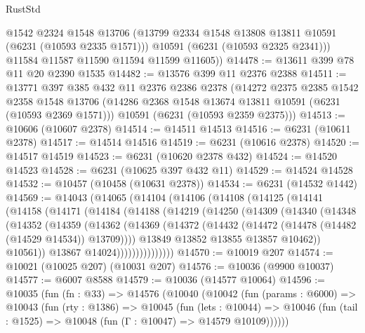 \begin{lexlean}{RustStd}
\begin{coremodule}
{{          @1542
          @2324
          @1548
          @13706
          (@13799 @2334 @1548 @13808 @13811 @10591 (@6231 (@10593 @2335 @1571)))
          @10591
          (@6231 (@10593 @2325 @2341)))
        @11584
        @11587
        @11590
        @11594
        @11599
        @11605))
@14478 := @13611 @399 @78 @11 @20 @2390 @1535
@14482 := @13576 @399 @11 @2376 @2388
@14511 := @13771
    @397
    @385
    @432
    @11
    @2376
    @2386
    @2378
    (@14272
      @2375
      @2385
      @1542
      @2358
      @1548
      @13706
      (@14286 @2368 @1548 @13674 @13811 @10591 (@6231 (@10593 @2369 @1571)))
      @10591
      (@6231 (@10593 @2359 @2375)))
@14513 := @10606 (@10607 @2378)
@14514 := @14511 @14513
@14516 := @6231 (@10611 @2378)
@14517 := @14514 @14516
@14519 := @6231 (@10616 @2378)
@14520 := @14517 @14519
@14523 := @6231 (@10620 @2378 @432)
@14524 := @14520 @14523
@14528 := @6231 (@10625 @397 @432 @11)
@14529 := @14524 @14528
@14532 := @10457 (@10458 (@10631 @2378))
@14534 := @6231 (@14532 @1442)
@14569 := @14043
    (@14065
      (@14104
        (@14106
          (@14108
            (@14125
              (@14141
                (@14158
                  (@14171
                    (@14184
                      (@14188
                        (@14219
                          (@14250
                            (@14309
                              (@14340
                                (@14348
                                  (@14352
                                    (@14359
                                      (@14362
                                        (@14369
                                          (@14372
                                            (@14432
                                              (@14472 (@14478 (@14482 (@14529 @14534)) @13709))))
                                          @13849
                                          @13852
                                          @13855
                                          @13857
                                          @10462))
                                      @10561))
                                  @13867
                                  @14024)))))))))))))))
@14570 := @10019 @207
@14574 := @10021 (@10025 @207) (@10031 @207)
@14576 := @10036 (@9900 @10037)
@14577 := @6007 @8588
@14579 := @10036 (@14577 @10064)
@14596 := @10035
    (fun (fn : @33) =>
    @14576
      (@10040
        (@10042
          (fun (params : @6000) =>
          @10043
            (fun (rty : @1386) =>
            @10045
              (fun (lets : @10044) =>
              @10046 (fun (tail : @1525) => @10048 (fun (Γ : @10047) => @14579 @10109))))))
}}
\end{coremodule}
\end{lexlean}
